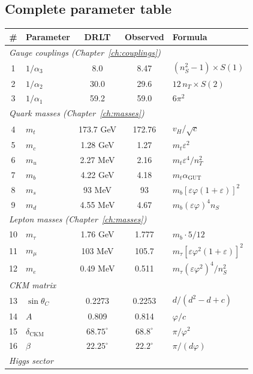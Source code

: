 \subsection{Complete parameter table}

\begin{center}
\small
\begin{tabular}{clccl}
\hline
\# & Parameter & DRLT & Observed & Formula \\
\hline
\multicolumn{5}{l}{\emph{Gauge couplings (Chapter~\ref{ch:couplings})}} \\
1 & $1/\alpha_3$ & 8.0 & 8.47 & $(n_S^2-1) \times S(1)$ \\
2 & $1/\alpha_2$ & 30.0 & 29.6 & $12\,n_T \times S(2)$ \\
3 & $1/\alpha_1$ & 59.2 & 59.0 & $6\pi^2$ \\
\hline
\multicolumn{5}{l}{\emph{Quark masses (Chapter~\ref{ch:masses})}} \\
4 & $m_t$ & 173.7 GeV & 172.76 & $v_H/\sqrt{c}$ \\
5 & $m_c$ & 1.28 GeV & 1.27 & $m_t\varepsilon^2$ \\
6 & $m_u$ & 2.27 MeV & 2.16 & $m_t\varepsilon^4/n_T^2$ \\
7 & $m_b$ & 4.22 GeV & 4.18 & $m_t\alpha_\text{GUT}$ \\
8 & $m_s$ & 93 MeV & 93 & $m_b[\varepsilon\varphi(1\!+\!\varepsilon)]^2$ \\
9 & $m_d$ & 4.55 MeV & 4.67 & $m_b(\varepsilon\varphi)^4 n_S$ \\
\hline
\multicolumn{5}{l}{\emph{Lepton masses (Chapter~\ref{ch:masses})}} \\
10 & $m_\tau$ & 1.76 GeV & 1.777 & $m_b \cdot 5/12$ \\
11 & $m_\mu$ & 103 MeV & 105.7 & $m_\tau[\varepsilon\varphi^2(1\!+\!\varepsilon)]^2$ \\
12 & $m_e$ & 0.49 MeV & 0.511 & $m_\tau(\varepsilon\varphi^2)^4/n_S^2$ \\
\hline
\multicolumn{5}{l}{\emph{CKM matrix}} \\
13 & $\sin\theta_C$ & 0.2273 & 0.2253 & $d/(d^2\!-\!d\!+\!c)$ \\
14 & $A$ & 0.809 & 0.814 & $\varphi/c$ \\
15 & $\delta_\text{CKM}$ & $68.75^\circ$ & $68.8^\circ$ & $\pi/\varphi^2$ \\
16 & $\beta$ & $22.25^\circ$ & $22.2^\circ$ & $\pi/(d\varphi)$ \\
\hline
\multicolumn{5}{l}{\emph{Higgs sector}} \\

\end{tabular}
\end{center}
